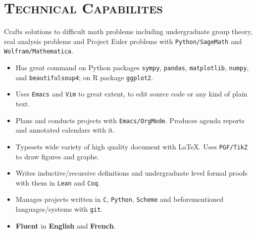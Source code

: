 \documentclass[oneside, 12pt]{memoir}
\begin{document}
\section*{\textsc{Technical Capabilites}}
\begin{tcolorbox}[left=2pt,right=2pt,top=2pt,bottom=2pt]
    Crafts solutions to difficult math problems including undergraduate
    group theory, real analysis problems and Project Euler problems with
    \texttt{Python/SageMath} and \texttt{Wolfram/Mathematica}.
\end{tcolorbox}
\begin{itemize}[leftmargin=*]
    \item Has great command on Python packages
        \texttt{sympy},
        \texttt{pandas},
        \texttt{matplotlib},
        \texttt{numpy},
        and
        \texttt{beautifulsoup4}; on R package
        \texttt{ggplot2}.
    \item Uses \texttt{Emacs} and \texttt{Vim} to great extent, to edit
        source code or any kind of plain text.
    \item Plans and conducts projects with \texttt{Emacs/OrgMode}.
        Produces agenda reports and annotated calendars with it.
    \item Typesets wide variety of high quality document with \LaTeX. Uses
        \texttt{PGF/TikZ} to draw figures and graphs.
    \item Writes inductive/recursive definitions and undergraduate level
        formal proofs with them in \texttt{Lean} and \texttt{Coq}.
    \item Manages projects written in \texttt{C}, \texttt{Python},
        \texttt{Scheme} and beforementioned languages/systems with
        \texttt{git}.
    \item \textbf{Fluent} in \textbf{English} and \textbf{French}.
\end{itemize}
\pagebreak
\end{document}

